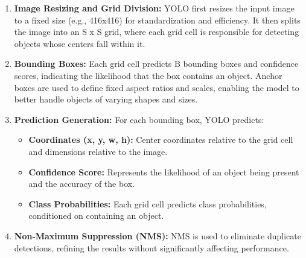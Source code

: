 \begin{enumerate}
  \item \textbf{Image Resizing and Grid Division:} YOLO first resizes the input image to a fixed size (e.g., 416x416) for standardization and efficiency. It then splits the image into an S x S grid, where each grid cell is responsible for detecting objects whose centers fall within it.
  \item \textbf{Bounding Boxes:} Each grid cell predicts B bounding boxes and confidence scores, indicating the likelihood that the box contains an object. Anchor boxes are used to define fixed aspect ratios and scales, enabling the model to better handle objects of varying shapes and sizes.
  \item \textbf{Prediction Generation:} For each bounding box, YOLO predicts:
   \begin{itemize}
  \item \textbf{Coordinates (x, y, w, h): } Center coordinates relative to the grid cell and dimensions relative to the image.
  \item \textbf{Confidence Score:} Represents the likelihood of an object being present and the accuracy of the box.
  \item \textbf{Class Probabilities:} Each grid cell predicts class probabilities, conditioned on containing an object.
   \end{itemize}
  \item \textbf{Non-Maximum Suppression (NMS):} NMS is used to eliminate duplicate detections, refining the results without significantly affecting performance.
\end{enumerate}
